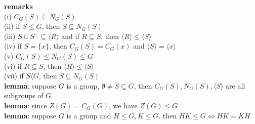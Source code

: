 \documentclass[a4paper]{article}
\begin{document}
\begin{multicols}{2}
\begin{framed}
	\noindent
	\textbf{remarks}\\
	(i) $C_G(S) \subseteq N_G(S)$\\
	(ii) if $S \leq G$, then $S \subseteq N_G(S)$\\
	(iii) $S \cup S^- \subseteq \langle R \rangle$ and if $R \subseteq S$, then $\langle R \rangle \leq \langle S \rangle$\\
	(iv) if $S = \{x\}$, then $C_G(S) = C_G(x)$ and $\langle S \rangle = \langle x \rangle$\\
	(v) $C_G(S) \leq N_G(S) \leq G$\\
	(vi) if $R \subseteq S$, then $\langle R \rangle \leq \langle S \rangle$\\
	(vii) if $S \langle G$, then $S \subseteq N_G(S)$\\
	
	\noindent
	\textbf{lemma}: suppose $G$ is a group, $\emptyset \neq S \subseteq G$, then $C_G(S), N_G(S), \langle S \rangle$ are all subgroups of $G$\\
	
	\noindent
	\textbf{lemma}: since $Z(G) = C_G(G)$, we have $Z(G) \leq G$\\
	
	\noindent
	\textbf{lemma}: suppose $G$ is a group and $H \leq G, K \leq G$. then $HK \leq G \iff HK = KH$
\end{framed}
	
\end{multicols}
\end{document}
